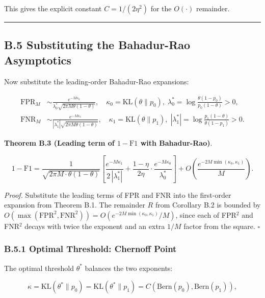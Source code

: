 \documentclass[
  12pt,
]{article}
\begin{document}
This gives the explicit constant \(C = 1/(2\eta^2)\) for the
\(O(\cdot)\) remainder.

\begin{center}\rule{0.5\linewidth}{0.5pt}\end{center}

\subsection{B.5 Substituting the Bahadur-Rao
Asymptotics}\label{b.5-substituting-the-bahadur-rao-asymptotics}

Now substitute the leading-order Bahadur-Rao expansions:

\[\begin{aligned}
\text{FPR}_M &\sim \frac{e^{-M\kappa_0}}{\lambda_0^* \sqrt{2\pi M \theta(1-\theta)}}, \quad
\kappa_0 = \text{KL}(\theta\|p_0),\; \lambda_0^* = \log\frac{\theta(1-p_0)}{p_0(1-\theta)} > 0, \\
\text{FNR}_M &\sim \frac{e^{-M\kappa_1}}{|\lambda_1^*| \sqrt{2\pi M \theta(1-\theta)}}, \quad
\kappa_1 = \text{KL}(\theta\|p_1),\; |\lambda_1^*| = \log\frac{p_1(1-\theta)}{\theta(1-p_1)} > 0.
\end{aligned}\]

\textbf{Theorem B.3 (Leading term of \(1-\text{F1}\) with Bahadur-Rao)}.

\[
1 - \text{F1} = \frac{1}{\sqrt{2\pi M \cdot \theta(1-\theta)}}
\left[\frac{e^{-M\kappa_1}}{2\,|\lambda_1^*|} + \frac{1-\eta}{2\eta}\cdot\frac{e^{-M\kappa_0}}{\lambda_0^*}\right]
+ O\!\left(\frac{e^{-2M\min(\kappa_0,\kappa_1)}}{M}\right).
\]

\emph{Proof.} Substitute the leading terms of FPR and FNR into the
first-order expansion from Theorem B.1. The remainder \(R\) from
Corollary B.2 is bounded by
\(O(\max(\text{FPR}^2,\text{FNR}^2)) = O(e^{-2M\min(\kappa_0,\kappa_1)}/M)\),
since each of FPR\(^2\) and FNR\(^2\) decays with twice the exponent and
an extra \(1/M\) factor from the square. \(\square\)

\subsubsection{B.5.1 Optimal Threshold: Chernoff
Point}\label{b.5.1-optimal-threshold-chernoff-point}

The optimal threshold \(\theta^*\) balances the two exponents:

\[\kappa = \text{KL}(\theta^*\|p_0) = \text{KL}(\theta^*\|p_1) = C(\text{Bern}(p_0), \text{Bern}(p_1)),\]
\end{document}
